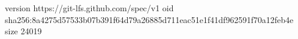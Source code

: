 version https://git-lfs.github.com/spec/v1
oid sha256:8a4275d57533b07b391f64d79a26885d711eac51e1f41df962591f70a12feb4e
size 24019
